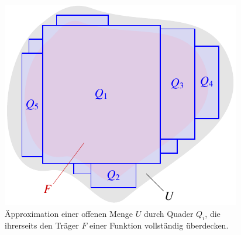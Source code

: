 %
%
%
\begin{figure}
\centering
\includegraphics{chapters/040-green/images/quader.pdf}
\caption{Äpproximation einer offenen Menge $U$ durch Quader $Q_i$,
die ihrerseits den Träger $F$ einer Funktion vollständig überdecken.
\label{buch:green:fig:quader}}
\end{figure}
